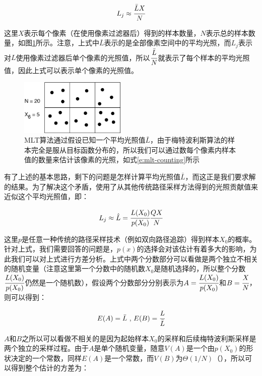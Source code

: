 \begin{equation}\label{e:mlt-counting}
	L_j\approx \cfrac{\bar{L}X}{N}
\end{equation}

\noindent 这里$X$表示每个像素（在使用像素过滤器后）得到的样本数量，$N$表示总的样本数量，如图\ref{f:mlt-mlt-counting}所示。注意，上式中$\bar{L}$表示的是全部像素空间中的平均光照，而$L_j$表示对$L$使用像素过滤器后单个像素的光照值，所以$ \cfrac{\bar{L}}{N}$就表示了每个样本的平均光照值，因此上式可以表示单个像素的光照值。

\begin{figure}
	\sidecaption
	\includegraphics[width=0.45\textwidth]{figures/mlt/mlt-counting}
	\caption{MLT算法通过假设已知一个平均光照值$\bar{L}$，由于梅特波利斯算法的样本完全是服从目标函数分布的，所以我们可以通过数每个像素内样本值的数量来估计该像素的光照，如式\ref{e:mlt-counting}所示}
	\label{f:mlt-mlt-counting}
\end{figure}

有了上述的基本思路，剩下的问题是怎样计算平均光照值$\bar{L}$，而这正是我们要求解的结果。为了解决这个矛盾，\cite{a:MetropolisLightTransport}使用了从其他传统路径采样方法得到的光照贡献值来近似这个平均光照值，即：

\begin{equation}\label{e:mlt-unbiased}
	L_j\approx\hat{L}= \cfrac{L(X_0)}{p(X_0)} \cfrac{QX}{N}
\end{equation}

\noindent 这里$p$是任意一种传统的路径采样技术（例如双向路径追踪）得到样本$X_0$的概率。针对上式，我们需要回答的问题是，$p(x)$的选择会对该估计有着多大的影响，为此我们可以对上式进行方差分析。上式中两个分数部分可以看做是两个独立不相关的随机变量（注意这里第一个分数中的随机数$X_0$是随机选择的，所以整个分数$ \cfrac{L(X_0)}{p(X_0)}$仍然是一个随机数），假设两个分数部分分别表示为$A= \cfrac{L(X_0)}{p(X_0)}$和$B= \cfrac{X}{N}$，则可以得到：

\begin{equation}
	E(A)=\bar{L}\text{ , }
	E(B)= \cfrac{L}{\bar{L}}
\end{equation}

\noindent $A$和$B$之所以可以看做不相关的是因为起始样本$X_0$的采样和后续梅特波利斯采样是两个独立的采样过程。由于$A$是单个随机变量，随意$V(A)$是一个由$p(X_0)$的形状决定的一个常数，同样$E(A)$是一个常数，而$V(B)$为$\Theta(1/N)$（\cite{a:AVarianceAnalysisoftheMetropolisLightTransportAlgorithm}），所以可以得到整个估计的方差为：

